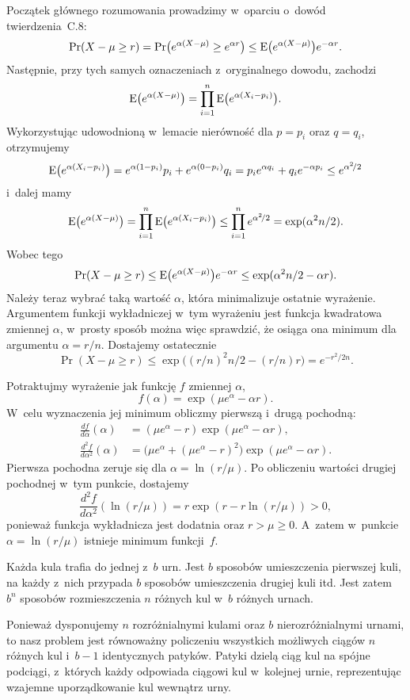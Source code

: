 Początek głównego rozumowania prowadzimy w~oparciu o~dowód twierdzenia~C.8:
\[
	\Pr(X-\mu\ge r) = \Pr\bigl(e^{\alpha(X-\mu)}\ge e^{\alpha r}\bigr) \le \operatorname{E}\bigl(e^{\alpha(X-\mu)}\bigr)e^{-\alpha r}.
\]
Następnie, przy tych samych oznaczeniach z~oryginalnego dowodu, zachodzi
\[
	\operatorname{E}\bigl(e^{\alpha(X-\mu)}\bigr) = \prod_{i=1}^n\operatorname{E}\bigl(e^{\alpha(X_i-p_i)}\bigr).
\]
Wykorzystując udowodnioną w~lemacie nierówność dla $p=p_i$ oraz $q=q_i$, otrzymujemy
\[
	\operatorname{E}\bigl(e^{\alpha(X_i-p_i)}\bigr) = e^{\alpha(1-p_i)}p_i+e^{\alpha(0-p_i)}q_i = p_ie^{\alpha q_i}+q_ie^{-\alpha p_i} \le e^{\alpha^2\!/2}
\]
i~dalej mamy
\[
	\operatorname{E}\bigl(e^{\alpha(X-\mu)}\bigr) = \prod_{i=1}^n\operatorname{E}\bigl(e^{\alpha(X_i-p_i)}\bigr) \le \prod_{i=1}^ne^{\alpha^2\!/2} = \exp(\alpha^2n/2).
\]
Wobec tego
\[
	\Pr(X-\mu\ge r) \le \operatorname{E}\bigl(e^{\alpha(X-\mu)}\bigr)e^{-\alpha r} \le \exp(\alpha^2n/2-\alpha r).
\]
Należy teraz wybrać taką wartość $\alpha$, która minimalizuje ostatnie wyrażenie. Argumentem funkcji wykładniczej w~tym wyrażeniu jest funkcja kwadratowa zmiennej $\alpha$, w~prosty sposób można więc sprawdzić, że osiąga ona minimum dla argumentu $\alpha=r/n$. Dostajemy ostatecznie
\[
	\Pr(X-\mu\ge r) \le \exp\bigl((r/n)^2n/2-(r/n)r\bigr) = e^{-r^2\!/{2n}}.
\]

\exercise %
Potraktujmy wyrażenie jak funkcję $f$ zmiennej $\alpha$,
\[
	f(\alpha) = \exp(\mu e^\alpha-\alpha r).
\]
W~celu wyznaczenia jej minimum obliczmy pierwszą i~drugą pochodną:
\begin{align*}
	\frac{df}{d\alpha}(\alpha) &= (\mu e^\alpha-r)\exp(\mu e^\alpha-\alpha r), \\
	\frac{d^2\!f}{d\alpha^2}(\alpha) &= \bigl(\mu e^\alpha+(\mu e^\alpha-r)^2\bigr)\exp(\mu e^\alpha-\alpha r).
\end{align*}
Pierwsza pochodna zeruje się dla $\alpha=\ln(r/\mu)$. Po obliczeniu wartości drugiej pochodnej w~tym punkcie, dostajemy
\[
	\frac{d^2\!f}{d\alpha^2}(\ln(r/\mu)) = r\exp(r-r\ln(r/\mu)) > 0,
\]
ponieważ funkcja wykładnicza jest dodatnia oraz $r>\mu\ge0$. A~zatem w~punkcie $\alpha=\ln(r/\mu)$ istnieje minimum funkcji~$f$.

\problems


\subproblem %
Każda kula trafia do jednej z~$b$ urn. Jest $b$ sposobów umieszczenia pierwszej kuli, na każdy z~nich przypada $b$ sposobów umieszczenia drugiej kuli itd. Jest zatem $b^n$ sposobów rozmieszczenia $n$ różnych kul w~$b$ różnych urnach.

\subproblem %
Ponieważ dysponujemy $n$ rozróżnialnymi kulami oraz $b$ nierozróżnialnymi urnami, to nasz problem jest równoważny policzeniu wszystkich możliwych ciągów $n$ różnych kul i~$b-1$ identycznych patyków. Patyki dzielą ciąg kul na spójne podciągi, z~których każdy odpowiada ciągowi kul w~kolejnej urnie, reprezentując wzajemne uporządkowanie kul wewnątrz urny.

